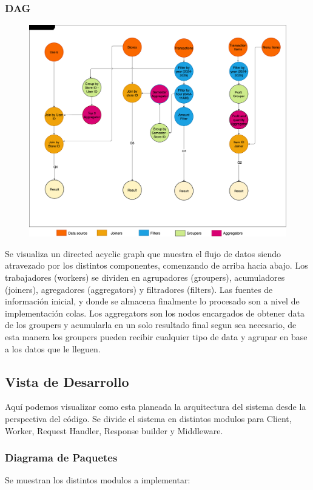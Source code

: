 \documentclass[titlepage,a4paper]{article}
\begin{document}
\subsubsection{DAG}
\begin{figure}[H]
\centering
    \includegraphics[width=1\linewidth]{DAG.png}
\end{figure}
Se visualiza un directed acyclic graph que muestra el flujo de datos siendo atravezado por los distintos componentes, comenzando de arriba hacia abajo. Los trabajadores (workers) se dividen en agrupadores (groupers), acumuladores (joiners), agregadores (aggregators) y filtradores (filters). Las fuentes de información inicial, y donde se almacena finalmente lo procesado son a nivel de implementación colas.
Los aggregators son los nodos encargados de obtener data de los groupers y acumularla en un solo resultado final segun sea necesario, de esta manera los groupers pueden recibir cualquier tipo de data y agrupar en base a los datos que le lleguen.


\subsection{Vista de Desarrollo}
Aquí podemos visualizar como esta planeada la arquitectura del sistema desde la perspectiva del código. Se divide el sistema en distintos modulos para Client, Worker, Request Handler, Response builder y Middleware.

\subsubsection{Diagrama de Paquetes}
Se muestran los distintos modulos a implementar:\newline
\end{document}
